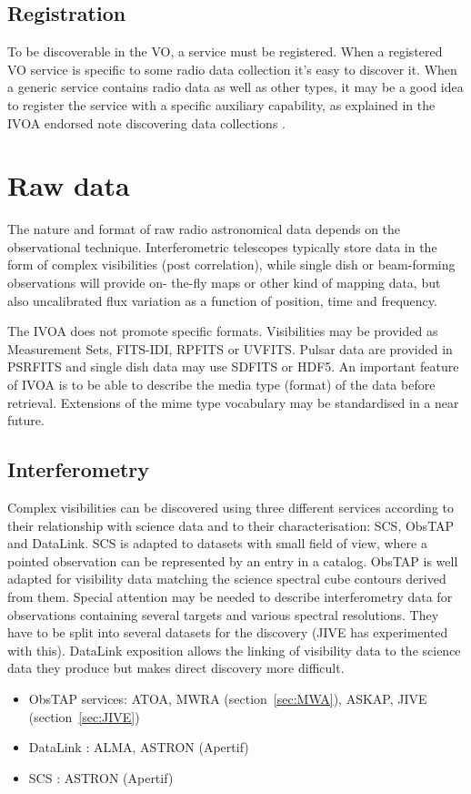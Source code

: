 \documentclass[11pt,a4paper]{ivoatex/ivoa}
\begin{document}
\subsection{Registration} 
To be discoverable in the VO, a service must be registered. When a registered VO service is specific to 
some radio data collection it's easy to discover it. When a generic service contains radio data as well 
as other types, it may be a good idea to register the service with a specific auxiliary capability, as 
explained in the IVOA endorsed note discovering data collections \citep{2019ivoa.rept.0520D}.

\section{Raw data}
The nature and format of raw radio astronomical data 
depends on the observational technique. Interferometric telescopes typically store data in the form of 
complex visibilities (post correlation), while single dish or beam-forming observations will provide on-
the-fly maps or other kind of mapping data, but also uncalibrated flux variation as a function of 
position, time and frequency. 

The IVOA does not promote specific formats. Visibilities may be provided as Measurement Sets, FITS-IDI, 
RPFITS or UVFITS. Pulsar data are provided in PSRFITS and single dish data may use SDFITS or HDF5. An 
important feature of IVOA is to be able to describe the media type (format) of the data before 
retrieval. Extensions of the mime type vocabulary may be standardised in a near future.  

\subsection{Interferometry}
Complex visibilities can be discovered using three different services according to their relationship 
with science data and to their characterisation: SCS, ObsTAP and DataLink. SCS is adapted to datasets 
with small field of view, where a pointed observation can be
represented by an entry in a catalog. ObsTAP is well adapted for visibility data matching the science 
spectral cube contours derived from them. Special attention may be needed to describe interferometry 
data for observations containing several targets and various spectral resolutions. They have to be split 
into several datasets for the discovery (JIVE has experimented with this). DataLink exposition allows 
the linking of visibility data to the science data they produce but makes direct discovery more 
difficult. 
\begin{itemize}
\item ObsTAP services: ATOA, MWRA (section~\ref{sec:MWA}), ASKAP, JIVE (section~\ref{sec:JIVE})
\item DataLink : ALMA, ASTRON (Apertif)
\item SCS : ASTRON (Apertif)
\end{itemize}
\end{document}
